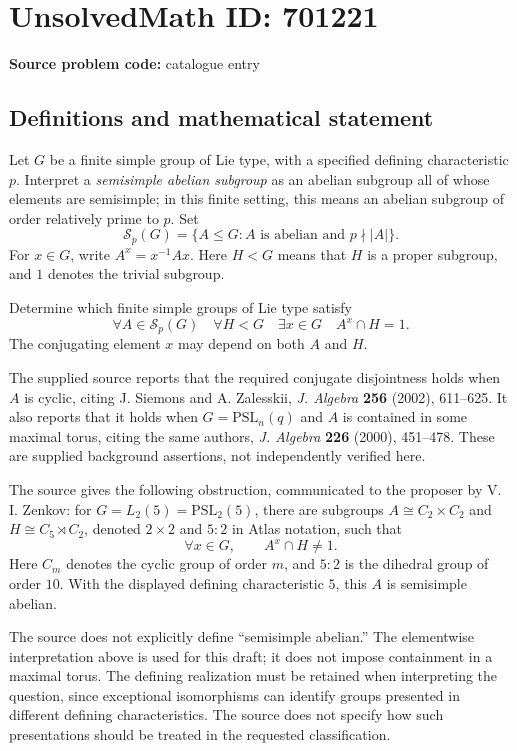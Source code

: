 \documentclass[11pt]{article}
\begin{document}
\section*{UnsolvedMath ID: 701221}
\textbf{Source problem code:} catalogue entry
\subsection{Definitions and mathematical statement}
Let \(G\) be a finite simple group of Lie type, with a specified defining characteristic \(p\). Interpret a \emph{semisimple abelian subgroup} as an abelian subgroup all of whose elements are semisimple; in this finite setting, this means an abelian subgroup of order relatively prime to \(p\). Set
\[
\mathcal{S}_p(G)=\{A\leq G: A\text{ is abelian and }p\nmid |A|\}.
\]
For \(x\in G\), write \(A^x=x^{-1}Ax\). Here \(H<G\) means that \(H\) is a proper subgroup, and \(1\) denotes the trivial subgroup.

Determine which finite simple groups of Lie type satisfy
\[
\forall A\in\mathcal{S}_p(G)\quad
\forall H<G\quad
\exists x\in G\quad
A^x\cap H=1.
\]
The conjugating element \(x\) may depend on both \(A\) and \(H\).

The supplied source reports that the required conjugate disjointness holds when \(A\) is cyclic, citing J. Siemons and A. Zalesskii, \emph{J. Algebra} \textbf{256} (2002), 611--625. It also reports that it holds when \(G=\mathrm{PSL}_n(q)\) and \(A\) is contained in some maximal torus, citing the same authors, \emph{J. Algebra} \textbf{226} (2000), 451--478. These are supplied background assertions, not independently verified here.

The source gives the following obstruction, communicated to the proposer by V. I. Zenkov: for \(G=L_2(5)=\mathrm{PSL}_2(5)\), there are subgroups \(A\cong C_2\times C_2\) and \(H\cong C_5\rtimes C_2\), denoted \(2\times2\) and \(5:2\) in Atlas notation, such that
\[
\forall x\in G,\qquad A^x\cap H\ne1.
\]
Here \(C_m\) denotes the cyclic group of order \(m\), and \(5:2\) is the dihedral group of order \(10\). With the displayed defining characteristic \(5\), this \(A\) is semisimple abelian.

The source does not explicitly define ``semisimple abelian.'' The elementwise interpretation above is used for this draft; it does not impose containment in a maximal torus. The defining realization must be retained when interpreting the question, since exceptional isomorphisms can identify groups presented in different defining characteristics. The source does not specify how such presentations should be treated in the requested classification.
\end{document}
